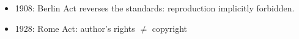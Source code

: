\documentclass[10pt,compress,serif]{beamer}
\begin{document}
\begin{frame}[t]
\begin{itemize}
 \item 1908: Berlin Act reverses the standards: reproduction implicitly forbidden. %
 \item 1928: Rome Act: author’s rights $\neq$ copyright
 \end{itemize}
\end{frame}

\end{document}
